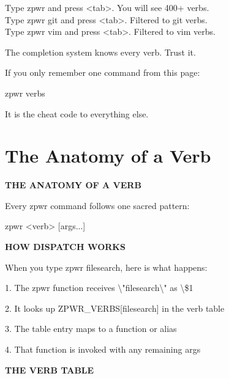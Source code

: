 \documentclass[11pt,a4paper,twoside]{book}
\begin{document}
\begin{codebox}
Type zpwr and press <tab>. You will see 400+ verbs.\\
Type zpwr git and press <tab>. Filtered to git verbs.\\
Type zpwr vim and press <tab>. Filtered to vim verbs.\\
\end{codebox}

The completion system knows every verb. Trust it.

If you only remember one command from this page:

zpwr verbs

It is the cheat code to everything else.


\vspace{16pt}

\section{The Anatomy of a Verb}


\vspace{10pt}
{\large\bfseries\color{neoncyan} THE ANATOMY OF A VERB}\vspace{6pt}

\begin{codebox}
Every zpwr command follows one sacred pattern:\\
\end{codebox}

zpwr <verb> [args...]


\vspace{12pt}
{\bfseries\color{neonyellow} HOW DISPATCH WORKS}\vspace{4pt}

\begin{codebox}
When you type zpwr filesearch, here is what happens:\\
\end{codebox}

1. The zpwr function receives \textbackslash{}"filesearch\textbackslash{}" as \textbackslash{}\$1

2. It looks up ZPWR\_VERBS[filesearch] in the verb table

3. The table entry maps to a function or alias

4. That function is invoked with any remaining args


\vspace{12pt}
{\bfseries\color{neonyellow} THE VERB TABLE}\vspace{4pt}
\end{document}
